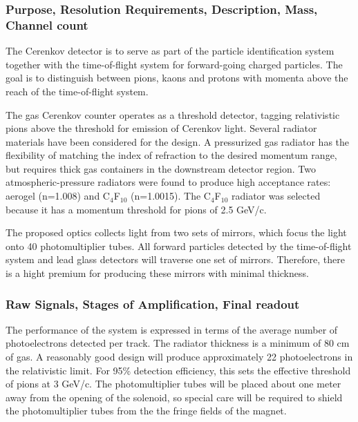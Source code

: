 \subsubsection*{Purpose, Resolution Requirements, Description, Mass, Channel count}

The Cerenkov detector is to serve as part of the particle identification system
together with the time-of-flight system for forward-going charged particles.
The goal is to distinguish between pions, kaons and protons with
momenta above the reach of the time-of-flight system. 

The gas Cerenkov counter operates as a threshold detector, tagging relativistic
pions above the threshold for emission of Cerenkov light. Several radiator materials have
been considered for the design. A pressurized gas radiator has the flexibility of
matching the index of refraction to the desired momentum range, but requires
thick gas containers in the downstream detector region. Two atmospheric-pressure
radiators were found to produce high acceptance rates: aerogel (n=1.008) and C$_4$F$_{10}$
(n=1.0015). The C$_4$F$_{10}$ radiator was selected because it has a momentum
threshold for pions of 2.5 GeV/c.

The proposed optics collects light from two sets of mirrors, which focus
the light onto 40 photomultiplier tubes. All forward particles detected by the
time-of-flight system and lead glass detectors will traverse one set of 
mirrors. Therefore, there is a hight premium for producing these mirrors with
minimal thickness.


\subsubsection*{Raw Signals, Stages of Amplification, Final readout}

The performance of the system is expressed in terms of the average number
of photoelectrons detected per track. The radiator thickness is a minimum
of 80 cm of gas. A reasonably good design will produce
approximately 22 photoelectrons in the relativistic limit. For 95\%
detection efficiency, this sets the effective threshold of pions at 3 GeV/c.
The photomultiplier tubes will be placed about one meter away from the
opening of the solenoid, so special care will be required to
shield the photomultiplier tubes from the the fringe fields of the magnet.

